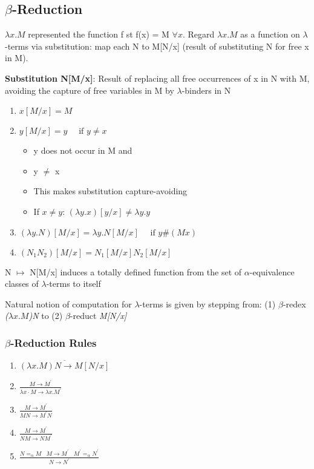 \documentclass{article}
\newenvironment{example}{\par\color{brown}}{\par}
\begin{document}
\subsection{$\beta$-Reduction}
$\lambda x.M$ represented the function f st f(x) = M $\forall x$. Regard $\lambda x.M$ as a function on $\lambda$-terms via substitution: map each N to M[N/x] (result of substituting N for free x in M).

\bigskip
\noindent
\textbf{Substitution N[M/x]}: Result of replacing all free occurrences of x in N with M, avoiding the capture of free variables in M by $\lambda$-binders in N
\begin{enumerate}
    \item $x[M / x]=M$
    \item $y[M / x]=y \quad \text { if } y \neq x$
    \begin{itemize}
        \item y does not occur in M and
        \item y $\neq$ x
        \item This makes substitution capture-avoiding
        \begin{example}
        \item If $x \neq y$: $(\lambda y.x)[y/x] \neq \lambda y.y$
        \end{example}
    \end{itemize}
    \item $(\lambda y . N)[M / x]=\lambda y . N[M / x] \quad \text { if } y \#(M x)$
    \item $\left(N_{1} N_{2}\right)[M / x]=N_{1}[M / x] N_{2}[M / x]$
\end{enumerate}

\noindent
N $\mapsto$ N[M/x] induces a totally defined function from the set of $\alpha$-equivalence classes of $\lambda$-terms to itself

\bigskip
Natural notion of computation for $\lambda$-terms is given by stepping from: (1) $\beta$-redex \textit{($\lambda x.M$)N} to (2) $\beta$-reduct \textit{M[N/x]}


\subsubsection{$\beta$-Reduction Rules}
\begin{enumerate}
    \item $\overline{(\lambda x . M) N \rightarrow M[N / x]}$
    
    \item $\frac{M \rightarrow M^{\prime}}{\lambda x \cdot M \rightarrow \lambda x . M^{\prime}}$
    
    \item $\frac{M \rightarrow M^{\prime}}{M N \rightarrow M^{\prime} N}$
    
    \item $\frac{M \rightarrow M^{\prime}}{N M \rightarrow N M^{\prime}}$
    
    \item $\frac{N =_{\alpha}M \; \; \; M \rightarrow M^{\prime} \; \; \; M^{\prime} =_{\alpha}N^{\prime}}{N\rightarrow N^{\prime}}$
\end{enumerate}
\end{document}
